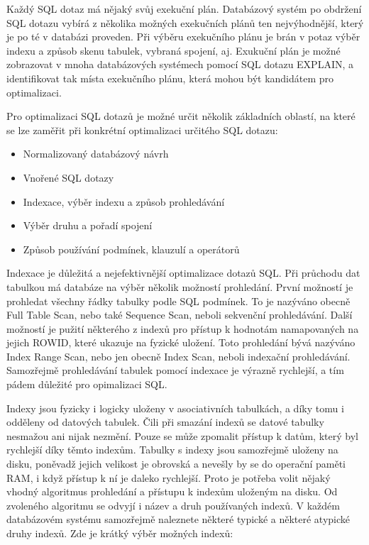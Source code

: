 \documentclass[12pt]{article}
\begin{document}
Každý SQL dotaz má nějaký svůj exekuční plán. Databázový systém po obdržení SQL dotazu vybírá z několika možných exekučních plánů ten nejvýhodnější, který je po té v databázi proveden. Při výběru exekučního plánu je brán v potaz výběr indexu a způsob skenu tabulek, vybraná spojení, aj. Exukuční plán je možné zobrazovat v mnoha databázových systémech pomocí SQL dotazu EXPLAIN, a identifikovat tak místa exekučního plánu, která mohou být kandidátem pro optimalizaci.\cite{optimalizace-sql}

Pro optimalizaci SQL dotazů je možné určit několik základních oblastí, na které se lze zaměřit při konkrétní optimalizaci určitého SQL dotazu:

\begin{itemize}
\item Normalizovaný databázový návrh
\item Vnořené SQL dotazy
\item Indexace, výběr indexu a způsob prohledávání
\item Výběr druhu a pořadí spojení
\item Způsob používání podmínek, klauzulí a operátorů
\end{itemize}

Indexace je důležitá a nejefektivnější optimalizace dotazů SQL. Při průchodu dat tabulkou má databáze na výběr několik možností prohledání. První možností je prohledat všechny řádky tabulky podle SQL podmínek. To je nazýváno obecně Full Table Scan, nebo také Sequence Scan, neboli sekvenční prohledávání. Další možností je pužití některého z indexů pro přístup k hodnotám namapovaných na jejich ROWID, které ukazuje na fyzické uložení. Toto prohledání bývá nazýváno Index Range Scan, nebo jen obecně Index Scan, neboli indexační prohledávání. Samozřejmě prohledávání tabulek pomocí indexace je výrazně rychlejší, a tím pádem důležité pro opimalizaci SQL. \cite{optimalizace-sql}

Indexy jsou fyzicky i logicky uloženy v asociativních tabulkách, a díky tomu i odděleny od datových tabulek. Čili při smazání indexů se datové tabulky nesmažou ani nijak nezmění. Pouze se může zpomalit přístup k datům, který byl rychlejší díky těmto indexům. Tabulky s indexy jsou samozřejmě uloženy na disku, poněvadž jejich velikost je obrovská a nevešly by se do operační paměti RAM, i když přístup k ní je daleko rychlejší. Proto je potřeba volit nějaký vhodný algoritmus prohledání a přístupu k indexům uloženým na disku. Od zvoleného algoritmu se odvyjí i název a druh používaných indexů. V každém databázovém systému samozřejmě naleznete některé typické a některé atypické druhy indexů. \cite{optimalizace-sql} Zde je krátký výběr možných indexů:
\end{document}
